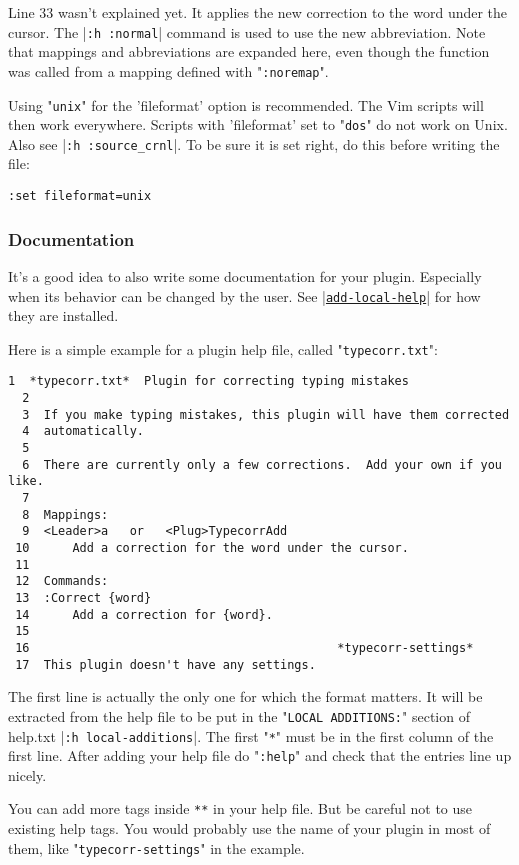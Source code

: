 Line 33 wasn't explained yet.
It applies the new correction to the word under the cursor.
The |\verb!:h :normal!| command is used to use the new abbreviation.
Note that mappings and abbreviations are expanded here, even though the function was called from a mapping defined with "\verb!:noremap!".

Using "\verb!unix!" for the 'fileformat' option is recommended.
The Vim scripts will then work everywhere.
Scripts with 'fileformat' set to "\verb!dos!" do not work on Unix.
Also see |\verb!:h :source_crnl!|.
To be sure it is set right, do this before writing the file:

\begin{Verbatim}[samepage=true]
 :set fileformat=unix
\end{Verbatim}

\subsubsection{Documentation}
\label{write-local-help}
It's a good idea to also write some documentation for your plugin.
Especially when its behavior can be changed by the user.
See \hyperref[add-local-help]{|\texttt{add-local-help}|} for how they are installed.

Here is a simple example for a plugin help file, called "\verb!typecorr.txt!":

\begin{Verbatim}[samepage=true]
  1  *typecorr.txt*  Plugin for correcting typing mistakes
  2
  3  If you make typing mistakes, this plugin will have them corrected
  4  automatically.
  5
  6  There are currently only a few corrections.  Add your own if you like.
  7
  8  Mappings:
  9  <Leader>a   or   <Plug>TypecorrAdd
 10      Add a correction for the word under the cursor.
 11
 12  Commands:
 13  :Correct {word}
 14      Add a correction for {word}.
 15
 16                                           *typecorr-settings*
 17  This plugin doesn't have any settings.
\end{Verbatim}

The first line is actually the only one for which the format matters.
It will be extracted from the help file to be put in the "\verb!LOCAL ADDITIONS:!" section of help.txt |\verb!:h local-additions!|.
The first "\verb!*!" must be in the first column of the first line.
After adding your help file do "\verb!:help!" and check that the entries line up nicely.

You can add more tags inside \verb!**! in your help file.
But be careful not to use existing help tags.
You would probably use the name of your plugin in most of them, like "\verb!typecorr-settings!" in the example.

